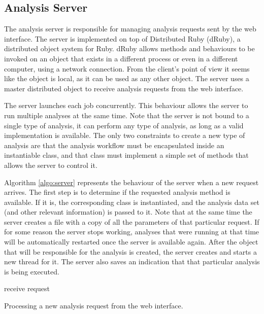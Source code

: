 \subsection{Analysis Server}

The analysis server is responsible for managing analysis requests sent by the
web interface. The server is implemented on top of Distributed Ruby (dRuby), a
distributed object system for Ruby. dRuby allows methods and behaviours to be
invoked on an object that exists in a different process or even in a different
computer, using a network connection. From the client's point of view it seems
like the object is local, as it can be used as any other object. The server uses
a master distributed object to receive analysis requests from the web interface.

The server launches each job concurrently. This behaviour allows the server to
run multiple analyses at the same time. Note that the server is not bound to a
single type of analysis, it can perform any type of analysis, as long as a valid
implementation is available. The only two constraints to create a new type of
analysis are that the analysis workflow must be encapsulated inside an
instantiable class, and that class must implement a simple set of methods that
allows the server to control it.

Algorithm \ref{algo:server} represents the behaviour of the server when a new
request arrives. The first step is to determine if the requested analysis method
is available. If it is, the corresponding class is instantiated, and the
analysis data set (and other relevant information) is passed to it. Note that
at the same time the server creates a file with a copy of all the parameters of
that particular request. If for some reason the server stops working, analyses
that were running at that time will be automatically restarted once the server
is available again. After the object that will be responsible for the analysis
is created, the server creates and starts a new thread for it. The server also
saves an indication that that particular analysis is being executed.

\begin{algorithm}
  receive request\;
  \BlankLine

  \caption[Processing a new analysis request from the web interface]{
    Processing a new analysis request from the web interface.
  }
  \label{algo:server}
\end{algorithm}

